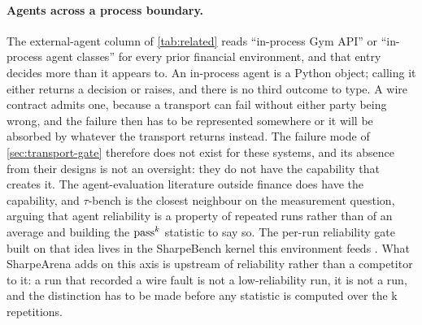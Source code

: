 \paragraph{Agents across a process boundary.} The external-agent column of \cref{tab:related} reads ``in-process Gym API'' or ``in-process agent classes'' for every prior financial environment, and that entry decides more than it appears to. An in-process agent is a Python object; calling it either returns a decision or raises, and there is no third outcome to type. A wire contract admits one, because a transport can fail without either party being wrong, and the failure then has to be represented somewhere or it will be absorbed by whatever the transport returns instead. The failure mode of \cref{sec:transport-gate} therefore does not exist for these systems, and its absence from their designs is not an oversight: they do not have the capability that creates it. The agent-evaluation literature outside finance does have the capability, and $\tau$-bench \citep{yao2024taubench} is the closest neighbour on the measurement question, arguing that agent reliability is a property of repeated runs rather than of an average and building the $\text{pass}^{k}$ statistic to say so. The per-run reliability gate built on that idea lives in the SharpeBench kernel this environment feeds \citep{toca2026sharpebench}. What SharpeArena adds on this axis is upstream of reliability rather than a competitor to it: a run that recorded a wire fault is not a low-reliability run, it is not a run, and the distinction has to be made before any statistic is computed over the k repetitions.

